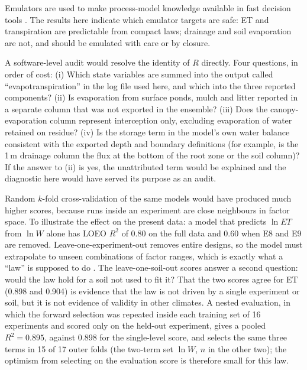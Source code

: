 Emulators are used to make process-model knowledge available in fast decision tools \citep{Razavi2012,Asher2015}. The results here indicate which emulator targets are safe: ET and transpiration are predictable from compact laws; drainage and soil evaporation are not, and should be emulated with care or by closure.

A software-level audit would resolve the identity of $R$ directly. Four questions, in order of cost: (i) Which state variables are summed into the output called ``evapotranspiration'' in the log file used here, and which into the three reported components? (ii) Is evaporation from surface ponds, mulch and litter reported in a separate column that was not exported in the ensemble? (iii) Does the canopy-evaporation column represent interception only, excluding evaporation of water retained on residue? (iv) Is the storage term in the model's own water balance consistent with the exported depth and boundary definitions (for example, is the 1\,m drainage column the flux at the bottom of the root zone or the soil column)? If the answer to (ii) is yes, the unattributed term would be explained and the diagnostic here would have served its purpose as an audit.

Random $k$-fold cross-validation of the same models would have produced much higher scores, because runs inside an experiment are close neighbours in factor space. To illustrate the effect on the present data: a model that predicts $\ln\mathit{ET}$ from $\ln W$ alone has LOEO $R^2$ of 0.80 on the full data and 0.60 when E8 and E9 are removed. Leave-one-experiment-out removes entire designs, so the model must extrapolate to unseen combinations of factor ranges, which is exactly what a ``law'' is supposed to do \citep{Roberts2017}. The leave-one-soil-out scores answer a second question: would the law hold for a soil not used to fit it? That the two scores agree for ET (0.898 and 0.904) is evidence that the law is not driven by a single experiment or soil, but it is not evidence of validity in other climates. A nested evaluation, in which the forward selection was repeated inside each training set of 16 experiments and scored only on the held-out experiment, gives a pooled $R^2=0.895$, against 0.898 for the single-level score, and selects the same three terms in 15 of 17 outer folds (the two-term set $\ln W$, $n$ in the other two); the optimism from selecting on the evaluation score is therefore small for this law.

